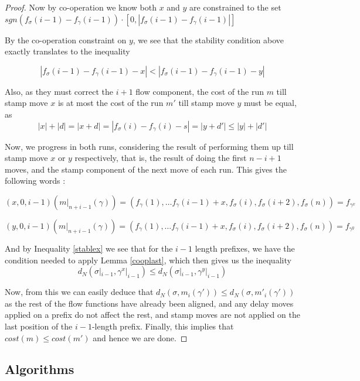 \documentclass{article}
\theoremstyle{Definition}
\theoremstyle{definition}
\begin{document}
\begin{proof}
	Now by co-operation we know both $x$ and $y$ are constrained to the set $sgn(f_\sigma(i-1) - f_\gamma(i-1)) \cdot [0, |f_\sigma(i-1) - f_\gamma(i-1)|]$
	
	By the co-operation constraint on $y$, we see that the stability condition above exactly translates to the inequality
	
	\begin{equation}\label{stablex}  
	|f_\sigma(i-1) - f_\gamma(i-1) -x| < |f_\sigma(i-1) - f_\gamma(i-1) -y|
	\end{equation} 
	
	 
	Also, as they must correct the $i+1$ flow component, the cost of the run $m$ till stamp move $x$ is at most the cost of the run $m'$ till stamp move $y$ must be equal, as $$|x| + |d| = |x + d| = |f_\sigma(i) - f_\gamma(i) -s| = |y + d'| \leq |y| + |d'|$$
	
	Now, we progress in both runs, considering the result of performing them up till stamp move $x$ or $y$ respectively, that is, the result of doing the first $n-i + 1$ moves, and the stamp component of the next move of each run. This gives the following words : 
	
	$$(x, 0, i-1)(m|_{n+i-1}(\gamma)) = (f_\gamma(1), \dots f_{\gamma}(i-1) + x , f_\sigma(i), f_\sigma(i+2), f_\sigma(n)) = f_{\gamma^x}$$
	
	$$(y, 0, i-1)(m|_{n+i-1}(\gamma)) = (f_\gamma(1), \dots f_{\gamma}(i-1) + x , f_\sigma(i), f_\sigma(i+2), f_\sigma(n)) = f_{\gamma^y}$$
	
	And by Inequality \ref{stablex} we see that for the $i-1$ length prefixes, we have the condition needed to apply Lemma \ref{cooplast}, which then gives us the inequality 
	$$d_N(\sigma|_{i-1}, \gamma^x|_{i-1}) \leq d_N(\sigma|_{i-1}, \gamma^y|_{i-1})$$
	
	Now, from this we can easily deduce that $d_N(\sigma, m_i(\gamma')) \leq d_N(\sigma, m'_i(\gamma'))$ as the rest of the flow functions have already been aligned, and any delay moves applied on a prefix do not affect the rest, and stamp moves are not applied on the last position of the $i-1$-length prefix. 
	Finally, this implies that $cost(m) \leq cost(m')$ and hence we are done. 
	\end{proof}
	
	\subsection{Algorithms}
	
\end{document}
